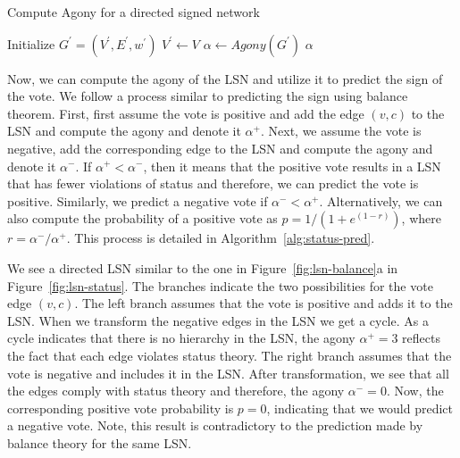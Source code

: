 \begin{algorithm}[htp]
    \DontPrintSemicolon
    \caption{Compute Agony for a directed signed network }
    \label{alg:signed-agony}
    Initialize $G^\prime = (V^\prime,E^\prime,w^\prime)$\;
    $V^\prime \leftarrow V$\;
    $\alpha \leftarrow Agony(G^\prime)$\; 
    \Return $\alpha$\;
\end{algorithm}

Now, we can compute the agony of the LSN and utilize it to predict the sign of the vote.
We follow a process similar to predicting the sign using balance theorem.
First, first assume the vote is positive and add the edge $(v,c)$ to the LSN and compute the agony and denote it $\alpha^+$.
Next, we assume the vote is negative, add the corresponding edge to the LSN and compute the agony and denote it $\alpha^-$.
If $\alpha^+ < \alpha^-$, then it means that the positive vote results in a LSN that has fewer violations of status and therefore, we can predict the vote is positive.
Similarly, we predict a negative vote if $\alpha^- < \alpha^+$.
Alternatively, we can also compute the probability of a positive vote as $p=1/(1+e^{(1-r)})$, where $r=\alpha^-/\alpha^+$.
This process is detailed in Algorithm~\ref{alg:status-pred}.

We see a directed LSN similar to the one in Figure~\ref{fig:lsn-balance}a in Figure~\ref{fig:lsn-status}.
The branches indicate the two possibilities for the vote edge $(v,c)$.
The left branch assumes that the vote is positive and adds it to the LSN.
When we transform the negative edges in the LSN we get a cycle.
As a cycle indicates that there is no hierarchy in the LSN, the agony $\alpha^+=3$ reflects the fact that each edge violates status theory.
The right branch assumes that the vote is negative and includes it in the LSN.
After transformation, we see that all the edges comply with status theory and therefore, the agony $\alpha^-=0$.
Now, the corresponding positive vote probability is $p=0$, indicating that we would predict a negative vote.
Note, this result is contradictory to the prediction made by balance theory for the same LSN.

